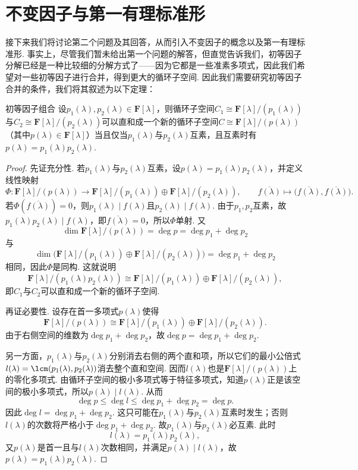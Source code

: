 \section{不变因子与第一有理标准形}
接下来我们将讨论第二个问题及其回答，从而引入不变因子的概念以及第一有理标准形. 事实上，尽管我们暂未给出第一个问题的解答，但直觉告诉我们，初等因子分解已经是一种比较细的分解方式了——因为它都是一些准素多项式，因此我们希望对一些初等因子进行合并，得到更大的循环子空间. 因此我们需要研究初等因子合并的条件，我们将其叙述为以下定理：
\begin{theorem}{}{初等因子组合}
    设$p_1(\lambda),p_2(\lambda)\in\mathbf{F}[\lambda]$，则循环子空间$C_1\cong\mathbf{F}[\lambda]/(p_1(\lambda))$与$C_2\cong\mathbf{F}[\lambda]/(p_2(\lambda))$可以直和成一个新的循环子空间$C\cong\mathbf{F}[\lambda]/(p(\lambda))$（其中$p(\lambda)\in\mathbf{F}[\lambda]$）当且仅当$p_1(\lambda)$与$p_2(\lambda)$互素，且互素时有$p(\lambda)=p_1(\lambda)p_2(\lambda)$.
\end{theorem}
\begin{proof}
    先证充分性. 若$p_1(\lambda)$与$p_2(\lambda)$互素，设$p(\lambda)=p_1(\lambda)p_2(\lambda)$，并定义线性映射
    \[
        \Phi:\mathbf{F}[\lambda]/(p(\lambda))\to \mathbf{F}[\lambda]/(p_1(\lambda))\oplus\mathbf{F}[\lambda]/(p_2(\lambda)),
        \qquad
        \overline{f(\lambda)}\mapsto \bigl(\overline{f(\lambda)},\overline{f(\lambda)}\bigr).
    \]
    若$\Phi(\overline{f(\lambda)})=0$，则$p_1(\lambda)\mid f(\lambda)$且$p_2(\lambda)\mid f(\lambda)$. 由于$p_1,p_2$互素，故$p_1(\lambda)p_2(\lambda)\mid f(\lambda)$，即$\overline{f(\lambda)}=0$，所以$\Phi$单射. 又
    \[
        \dim \mathbf{F}[\lambda]/(p(\lambda))=\deg p=\deg p_1+\deg p_2
    \]
    与
    \[
        \dim \bigl(\mathbf{F}[\lambda]/(p_1(\lambda))\oplus\mathbf{F}[\lambda]/(p_2(\lambda))\bigr)=\deg p_1+\deg p_2
    \]
    相同，因此$\Phi$是同构. 这就说明
    \[
        \mathbf{F}[\lambda]/(p_1(\lambda)p_2(\lambda))\cong \mathbf{F}[\lambda]/(p_1(\lambda))\oplus\mathbf{F}[\lambda]/(p_2(\lambda)),
    \]
    即$C_1$与$C_2$可以直和成一个新的循环子空间.

    再证必要性. 设存在首一多项式$p(\lambda)$使得
    \[
        \mathbf{F}[\lambda]/(p(\lambda))\cong \mathbf{F}[\lambda]/(p_1(\lambda))\oplus\mathbf{F}[\lambda]/(p_2(\lambda)).
    \]
    由于右侧空间的维数为$\deg p_1+\deg p_2$，故$\deg p=\deg p_1+\deg p_2$.

    另一方面，$p_1(\lambda)$与$p_2(\lambda)$分别消去右侧的两个直和项，所以它们的最小公倍式$l(\lambda)=\lcm(p_1(\lambda),p_2(\lambda))$消去整个直和空间. 因而$l(\lambda)$也是$\mathbf{F}[\lambda]/(p(\lambda))$上的零化多项式. 由循环子空间的极小多项式等于特征多项式，知道$p(\lambda)$正是该空间的极小多项式，所以$p(\lambda)\mid l(\lambda)$. 从而
    \[
        \deg p\leqslant \deg l\leqslant \deg p_1+\deg p_2=\deg p.
    \]
    因此$\deg l=\deg p_1+\deg p_2$. 这只可能在$p_1(\lambda)$与$p_2(\lambda)$互素时发生；否则$l(\lambda)$的次数将严格小于$\deg p_1+\deg p_2$. 故$p_1(\lambda)$与$p_2(\lambda)$必互素. 此时
    \[
        l(\lambda)=p_1(\lambda)p_2(\lambda),
    \]
    又$p(\lambda)$是首一且与$l(\lambda)$次数相同，并满足$p(\lambda)\mid l(\lambda)$，故$p(\lambda)=p_1(\lambda)p_2(\lambda)$.
\end{proof}

